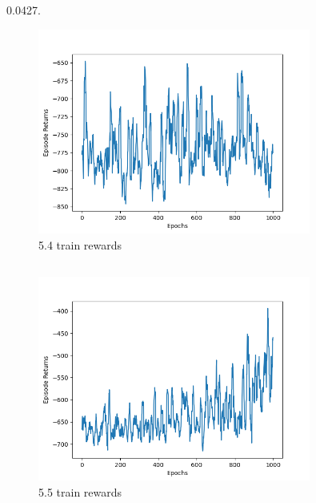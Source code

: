 \documentclass[12pt]{article}
\begin{document}
\subsection{}
0.0427.
\begin{figure}[H]
    \centering
    \includegraphics[width=0.8\textwidth]{imgs/q4.png}
    \caption{5.4 train rewards}
\end{figure}

\subsection{}
\begin{figure}[H]
    \centering
    \includegraphics[width=0.8\textwidth]{imgs/q5.png}
    \caption{5.5 train rewards}
\end{figure}
\end{document}
